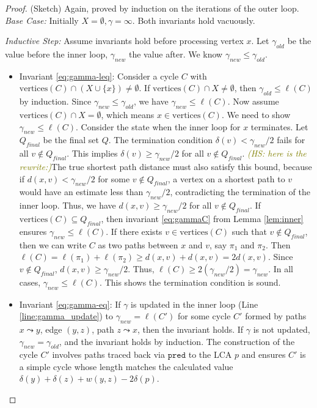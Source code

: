 \documentclass{article}
\newcommand{\ta}[1]{\textcolor{blue}{\textit{(TA: {#1})}}}
\newcommand{\hs}[1]{\textcolor{olive}{\textit{(HS: {#1})}}}
\begin{document}
\begin{proof}
(Sketch) Again, proved by induction on the iterations of the outer loop.
\textit{Base Case:} Initially $X=\emptyset, \gamma=\infty$. Both invariants hold vacuously.

\textit{Inductive Step:} Assume invariants hold before processing vertex $x$. Let $\gamma_{old}$ be the value before the inner loop, $\gamma_{new}$ the value after. We know $\gamma_{new} \le \gamma_{old}$.
\begin{itemize}
    \item Invariant \eqref{eq:gamma-leq}: Consider a cycle $C$ with $\text{vertices}(C) \cap (X \cup \{x\}) \neq \emptyset$. If $\text{vertices}(C) \cap X \neq \emptyset$, then $\gamma_{old} \le \ell(C)$ by induction. Since $\gamma_{new} \le \gamma_{old}$, we have $\gamma_{new} \le \ell(C)$. Now assume $\text{vertices}(C) \cap X = \emptyset$, which means $x \in \text{vertices}(C)$. We need to show $\gamma_{new} \le \ell(C)$.
    Consider the state when the inner loop for $x$ terminates. Let $Q_{final}$ be the final set $Q$. The termination condition $\delta(v) < \gamma_{new}/2$ fails for all $v \notin Q_{final}$. This implies $\delta(v) \ge \gamma_{new}/2$ for all $v \notin Q_{final}$. 
    \hs{here is the rewrite:}The true shortest path distance must also satisfy this bound, because if $d(x,v) < \gamma_{new}/2$ for some $v \notin Q_{final}$, a vertex on a shortest path to $v$ would have an estimate less than $\gamma_{new}/2$, contradicting the termination of the inner loop. Thus, we have $d(x,v) \ge \gamma_{new}/2$ for all $v \notin Q_{final}$.
    If $\text{vertices}(C) \subseteq Q_{final}$, then invariant \eqref{eq:gammaC} from Lemma \ref{lem:inner} ensures $\gamma_{new} \le \ell(C)$.
    If there exists $v \in \text{vertices}(C)$ such that $v \notin Q_{final}$, then we can write $C$ as two paths between $x$ and $v$, say $\pi_1$ and $\pi_2$. Then $\ell(C) = \ell(\pi_1) + \ell(\pi_2) \ge d(x,v) + d(x,v) = 2d(x,v)$. Since $v \notin Q_{final}$, $d(x,v) \ge \gamma_{new}/2$. Thus, $\ell(C) \ge 2(\gamma_{new}/2) = \gamma_{new}$. In all cases, $\gamma_{new} \le \ell(C)$. This shows the termination condition is sound.
    \item Invariant \eqref{eq:gamma-eq}: If $\gamma$ is updated in the inner loop (Line \ref{line:gamma_update}) to $\gamma_{new} = \ell(C')$ for some cycle $C'$ formed by paths $x \leadsto y$, edge $(y,z)$, path $z \leadsto x$, then the invariant holds. If $\gamma$ is not updated, $\gamma_{new} = \gamma_{old}$, and the invariant holds by induction. The construction of the cycle $C'$ involves paths traced back via $\texttt{pred}$ to the LCA $p$ and ensures $C'$ is a simple cycle whose length matches the calculated value $\delta(y) + \delta(z) + w(y,z) - 2\delta(p)$.
\end{itemize}
\end{proof}
\end{document}
